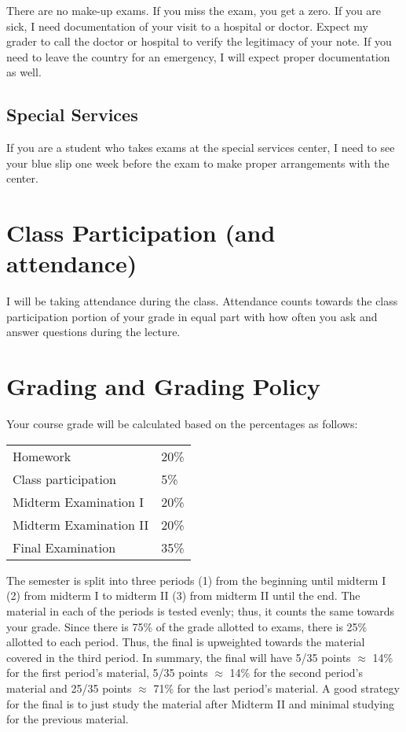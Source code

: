 \documentclass[12pt]{article}
\begin{document}
There are no make-up exams. If you miss the exam, you get a zero. If you are sick, I need documentation of your visit to a hospital or doctor. Expect my grader to call the doctor or hospital to verify the legitimacy of your note. If you need to leave the country for an emergency, I will expect proper documentation as well.

\subsection*{Special Services}

If you are a student who takes exams at the special services center, I need to see your blue slip one week before the exam to make proper arrangements with the center.

\section*{Class Participation (and attendance)}

I will be taking attendance during the class. Attendance counts towards the class participation portion of your grade in equal part with how often you ask and answer questions during the lecture.


\section*{Grading and Grading Policy}

Your course grade will be calculated based on the percentages as follows: 

\begin{table}[h]
\centering
\begin{tabular}{l|l}
Homework & 20\% \\
Class participation & 5\% \\
Midterm Examination I & 20\%\\
Midterm Examination II & 20\%\\
Final Examination & 35\%
\end{tabular}
\end{table}
\FloatBarrier

The semester is split into three periods (1) from the beginning until midterm I (2) from midterm I to midterm II (3) from midterm II until the end. The material in each of the periods is tested evenly; thus, it counts the same towards your grade. Since there is 75\% of the grade allotted to exams, there is 25\% allotted to each period. Thus, the final is upweighted towards the material covered in the third period. In summary, the final will have 5/35 points $\approx$ 14\% for the first period's material, 5/35 points $\approx$ 14\% for the second period's material and 25/35 points $\approx$ 71\% for the last period's material. A good strategy for the final is to just study the material after Midterm II and minimal studying for the previous material.
\end{document}
